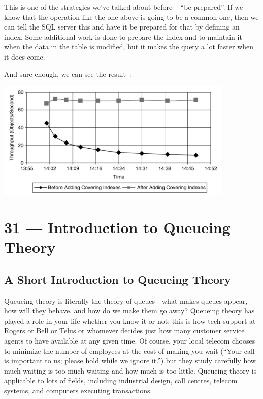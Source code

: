 \documentclass[a4paper]{report}
\begin{document}
This is one of the strategies we've talked about before -- ``be prepared''. If we know that the operation like the one above is going to be a common one, then we can tell the SQL server this and have it be prepared for that by defining an index. Some additional work is done to prepare the index and to maintain it when the data in the table is modified, but it makes the query a lot faster when it does come. 

And sure enough, we can see the result~\cite{swps}:

\begin{center}
	\includegraphics[width=0.85\textwidth]{images/adding-indexes.png}
\end{center}










\chapter*{31 --- Introduction to Queueing Theory}


\section*{A Short Introduction to Queueing Theory}

Queueing theory is literally the theory of queues---what makes queues appear, how will they behave, and how do we make them go away? Queueing theory has played a role in your life whether you know it or not: this is how tech support at Rogers or Bell or Telus or whomever decides just how many customer service agents to have available at any given time. Of course, your local telecom chooses to minimize the number of employees at the cost of making you wait (``Your call is important to us; please hold while we ignore it.'') but they study carefully how much waiting is too much waiting and how much is too little. Queueing theory is applicable to lots of fields, including industrial design, call centres, telecom systems, and computers executing transactions. 
\end{document}
